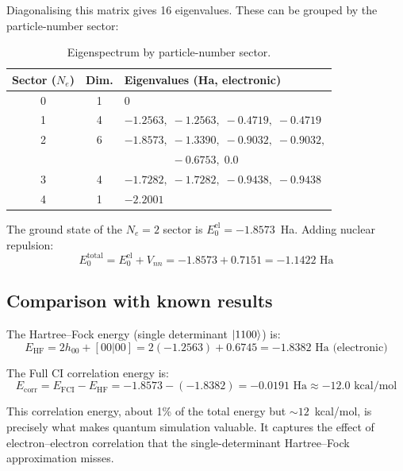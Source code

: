 \documentclass[aps,prb,preprint,longbibliography,nofootinbib]{revtex4-2}
\begin{document}
Diagonalising this matrix gives 16 eigenvalues.  These can be grouped
by the particle-number sector:

\begin{table}[h]
\centering
\begin{tabular}{@{}ccl@{}}
\toprule
\textbf{Sector} ($N_e$) & \textbf{Dim.}
  & \textbf{Eigenvalues (Ha, electronic)} \\
\midrule
0 & 1 & $0$ \\
1 & 4 & $-1.2563,\; -1.2563,\; -0.4719,\; -0.4719$ \\
2 & 6 & $-1.8573,\; -1.3390,\; -0.9032,\; -0.9032,$\\
  &   & $\phantom{-1.8573,\;}-0.6753,\; 0.0$ \\
3 & 4 & $-1.7282,\; -1.7282,\; -0.9438,\; -0.9438$ \\
4 & 1 & $-2.2001$ \\
\bottomrule
\end{tabular}
\caption{Eigenspectrum by particle-number sector.}
\label{tab:eigenvalues}
\end{table}

The ground state of the $N_e = 2$ sector is
$E_0^\text{el} = -1.8573$~Ha.  Adding nuclear repulsion:
\begin{equation}
E_0^\text{total} = E_0^\text{el} + V_{nn}
                 = -1.8573 + 0.7151 = -1.1422\text{~Ha}
\end{equation}

\subsection{Comparison with known results}

The Hartree--Fock energy (single determinant $\ket{1100}$) is:
\begin{equation}
E_\text{HF} = 2h_{00} + [00|00]
            = 2(-1.2563) + 0.6745
            = -1.8382\text{~Ha (electronic)}
\end{equation}

The Full CI correlation energy is:
\begin{equation}
E_\text{corr} = E_\text{FCI} - E_\text{HF}
              = -1.8573 - (-1.8382)
              = -0.0191\text{~Ha}
              \approx -12.0\text{~kcal/mol}
\end{equation}

This correlation energy, about 1\% of the total energy but
${\sim}12$~kcal/mol, is precisely what makes quantum simulation
valuable.  It captures the effect of electron--electron correlation that
the single-determinant Hartree--Fock approximation misses.
\end{document}
